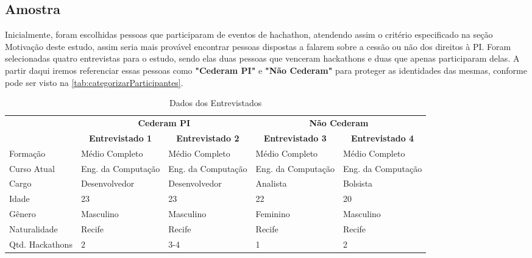\subsection{Amostra}

Inicialmente, foram escolhidas pessoas que participaram de eventos de hachathon, atendendo assim o critério especificado na seção Motivação deste estudo, assim seria mais provável encontrar pessoas dispostas a falarem sobre a cessão ou não dos direitos à PI. Foram selecionadas quatro entrevistas para o estudo, sendo elas duas pessoas que venceram hackathons e duas que apenas participaram delas. A partir daqui iremos referenciar essas pessoas como \textbf{"Cederam PI"} e \textbf{"Não Cederam"} para proteger as identidades das mesmas, conforme pode ser visto na \autoref{tab:categorizarParticipantes}. 

\begin{table}[H]
\centering
\caption{Dados dos Entrevistados}
\label{tab:categorizarParticipantes}
\begin{tabular}{lp{2.8cm}p{2.8cm}|p{2.8cm}p{2.8cm}}
                                  & \multicolumn{2}{c|}{\textbf{Cederam PI}} & \multicolumn{2}{c}{\textbf{Não Cederam}} \\
 &
  \multicolumn{1}{c}{\textbf{Entrevistado 1}} &
  \multicolumn{1}{c|}{\textbf{Entrevistado 2}} &
  \multicolumn{1}{c}{\textbf{Entrevistado 3}} &
  \multicolumn{1}{c}{\textbf{Entrevistado 4}} \\ \hline
\multicolumn{1}{l|}{Formação}     & Médio Completo      & Médio Completo     & Médio Completo      & Médio Completo     \\
\multicolumn{1}{l|}{Curso Atual} &
  Eng. da Computação &
  Eng. da Computação &
  Eng. da Computação &
  Eng. da Computação \\
\multicolumn{1}{l|}{Cargo}        & Desenvolvedor       & Desenvolvedor      & Analista            & Bolsista           \\
\multicolumn{1}{l|}{Idade}        & 23                  & 23                 & 22                  & 20                 \\
\multicolumn{1}{l|}{Gênero}       & Masculino           & Masculino          & Feminino            & Masculino          \\
\multicolumn{1}{l|}{Naturalidade} & Recife              & Recife             & Recife              & Recife     \\
\multicolumn{1}{l|}{Qtd. Hackathons} & 2                   & 3-4                & 1                   & 2                        
\end{tabular}
\end{table}

